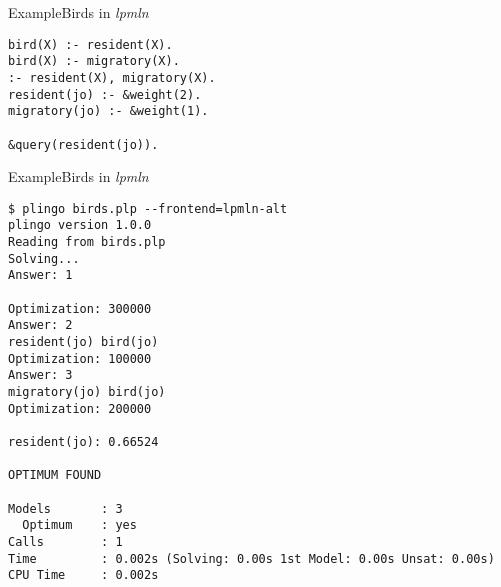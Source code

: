 \begin{frame}[fragile]{Example}{Birds in \textit{lpmln}}
\begin{lstlisting}[escapeinside=||]
bird(X) :- resident(X).
bird(X) :- migratory(X).
:- resident(X), migratory(X).
resident(jo) :- &weight(2).
migratory(jo) :- &weight(1).

&query(resident(jo)).
\end{lstlisting}
\end{frame}
\begin{frame}[fragile]{Example}{Birds in \textit{lpmln}}
\begin{adjustbox}{max totalsize={\textwidth}{.75\textheight},keepaspectratio}
\begin{lstlisting}[escapeinside=||]
$ plingo birds.plp --frontend=lpmln-alt
plingo version 1.0.0
Reading from birds.plp
Solving...
Answer: 1

Optimization: 300000
Answer: 2
resident(jo) bird(jo)
Optimization: 100000
Answer: 3
migratory(jo) bird(jo)
Optimization: 200000

resident(jo): 0.66524

OPTIMUM FOUND

Models       : 3
  Optimum    : yes
Calls        : 1
Time         : 0.002s (Solving: 0.00s 1st Model: 0.00s Unsat: 0.00s)
CPU Time     : 0.002s
\end{lstlisting}
\end{adjustbox}
\end{frame}
%
